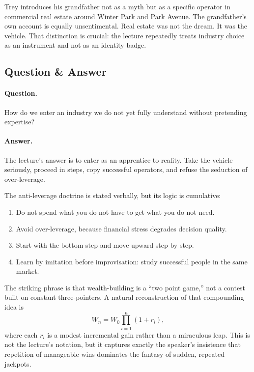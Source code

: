 Trey introduces his grandfather not as a myth but as a specific operator in commercial real estate around Winter Park and Park Avenue. The grandfather's own account is equally unsentimental. Real estate was not the dream. It was the vehicle. That distinction is crucial: the lecture repeatedly treats industry choice as an instrument and not as an identity badge.

\subsection{Question \& Answer}

\paragraph{Question.} How do we enter an industry we do not yet fully understand without pretending expertise?

\paragraph{Answer.} The lecture's answer is to enter as an apprentice to reality. Take the vehicle seriously, proceed in steps, copy successful operators, and refuse the seduction of over-leverage.

The anti-leverage doctrine is stated verbally, but its logic is cumulative:
\begin{enumerate}
\item Do not spend what you do not have to get what you do not need.
\item Avoid over-leverage, because financial stress degrades decision quality.
\item Start with the bottom step and move upward step by step.
\item Learn by imitation before improvisation: study successful people in the same market.
\end{enumerate}

The striking phrase is that wealth-building is a ``two point game,'' not a contest built on constant three-pointers. A natural reconstruction of that compounding idea is
\begin{equation}
W_n = W_0 \prod_{i=1}^{n} (1+r_i),
\end{equation}
where each \(r_i\) is a modest incremental gain rather than a miraculous leap. This is not the lecture's notation, but it captures exactly the speaker's insistence that repetition of manageable wins dominates the fantasy of sudden, repeated jackpots.

